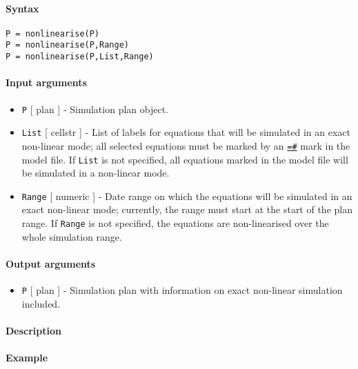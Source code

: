


	\paragraph{Syntax}\label{syntax}

\begin{verbatim}
P = nonlinearise(P)
P = nonlinearise(P,Range)
P = nonlinearise(P,List,Range)
\end{verbatim}

\paragraph{Input arguments}\label{input-arguments}

\begin{itemize}
\item
  \texttt{P} {[} plan {]} - Simulation plan object.
\item
  \texttt{List} {[} cellstr {]} - List of labels for equations that will
  be simulated in an exact non-linear mode; all selected equations must
  be marked by an \href{modellang/exactnonlin}{\texttt{=\#}} mark in the
  model file. If \texttt{List} is not specified, all equations marked in
  the model file will be simulated in a non-linear mode.
\item
  \texttt{Range} {[} numeric {]} - Date range on which the equations
  will be simulated in an exact non-linear mode; currently, the range
  must start at the start of the plan range. If \texttt{Range} is not
  specified, the equations are non-linearised over the whole simulation
  range.
\end{itemize}

\paragraph{Output arguments}\label{output-arguments}

\begin{itemize}
\itemsep1pt\parskip0pt
\item
  \texttt{P} {[} plan {]} - Simulation plan with information on exact
  non-linear simulation included.
\end{itemize}

\paragraph{Description}\label{description}

\paragraph{Example}\label{example}


